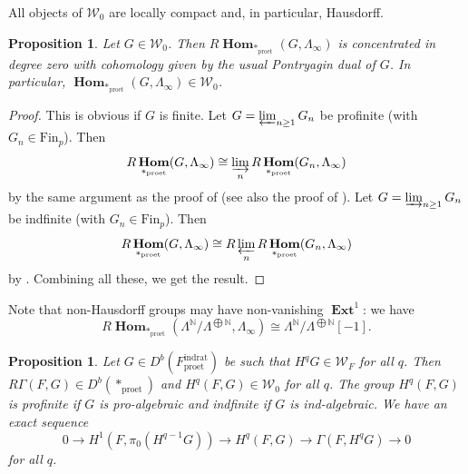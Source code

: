 \documentclass{amsart}
\newtheorem{Prop}[Thm]{Proposition}
\theoremstyle{remark}
\numberwithin{equation}{section}
\newcommand{\N}{\mathbb{N}}
\newcommand{\et}{\mathrm{et}}
\newcommand{\dirlim}{\varinjlim}
\newcommand{\invlim}{\varprojlim}
\newcommand{\rat}{\mathrm{rat}}
\newcommand{\ind}{\mathrm{ind}}
\newcommand{\pro}{\mathrm{pro}}
\newcommand{\alg}[1]{\mathbf{#1}}
\newcommand{\Fin}{\mathrm{Fin}}
\DeclareMathOperator{\sheafhom}{\alg{Hom}}
\DeclareMathOperator{\sheafext}{\alg{Ext}}
\begin{document}
All objects of $\mathcal{W}_{0}$ are locally compact and, in particular, Hausdorff.

\begin{Prop} \label{0105}
	Let $G \in \mathcal{W}_{0}$.
	Then $R \sheafhom_{\ast_{\pro\et}}(G, \Lambda_{\infty})$ is concentrated in degree zero
	with cohomology given by the usual Pontryagin dual of $G$.
	In particular, $\sheafhom_{\ast_{\pro\et}}(G, \Lambda_{\infty}) \in \mathcal{W}_{0}$.
\end{Prop}

\begin{proof}
	This is obvious if $G$ is finite.
	Let $G = \invlim_{n \ge 1} G_{n}$ be profinite (with $G_{n} \in \Fin_{p}$).
	Then
		\[
				R \sheafhom_{\ast_{\pro\et}}(G, \Lambda_{\infty})
			\cong
				\dirlim_{n}
					R \sheafhom_{\ast_{\pro\et}}(G_{n}, \Lambda_{\infty})
		\]
	by the same argument as the proof of \cite[Theorem (2.3.1) (c)]{Suz20}
	(see also the proof of \cite[Proposition 8.10]{BS20}).
	Let $G = \dirlim_{n \ge 1} G_{n}$ be indfinite (with $G_{n} \in \Fin_{p}$).
	Then
		\[
				R \sheafhom_{\ast_{\pro\et}}(G, \Lambda_{\infty})
			\cong
				R \invlim_{n}
					R \sheafhom_{\ast_{\pro\et}}(G_{n}, \Lambda_{\infty})
		\]
	by \cite[Proposition (2.2.3)]{Suz20}.
	Combining all these, we get the result.
\end{proof}

Note that non-Hausdorff groups may have non-vanishing $\sheafext^{1}$:
we have
	\[
			R \sheafhom_{\ast_{\pro\et}}(\Lambda^{\N} / \Lambda^{\bigoplus \N}, \Lambda_{\infty})
		\cong
			\Lambda^{\N} / \Lambda^{\bigoplus \N}[-1].
	\]

\begin{Prop} \label{0106}
	Let $G \in D^{b}(F^{\ind\rat}_{\pro\et})$ be such that
	$H^{q} G \in \mathcal{W}_{F}$ for all $q$.
	Then $R \Gamma(F, G) \in D^{b}(\ast_{\pro\et})$
	and $H^{q}(F, G) \in \mathcal{W}_{0}$ for all $q$.
	The group $H^{q}(F, G)$ is profinite if $G$ is pro-algebraic
	and indfinite if $G$ is ind-algebraic.
	We have an exact sequence
		\[
				0
			\to
				H^{1}(F, \pi_{0}(H^{q - 1} G))
			\to
				H^{q}(F, G)
			\to
				\Gamma(F, H^{q} G)
			\to
				0
		\]
	for all $q$.
\end{Prop}
\end{document}

